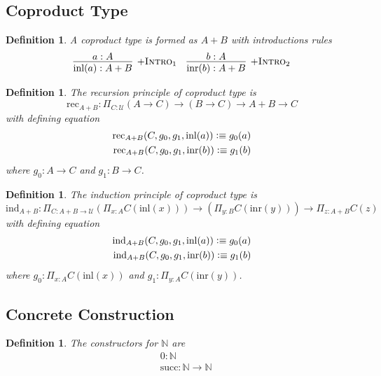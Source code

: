 \documentclass{article}
\newtheorem{definition}[theorem]{Definition}
\newcommand{\defeqv}{\vcentcolon\equiv}
\begin{document}
\subsection{Coproduct Type}

\begin{definition}
\rm A coproduct type is formed as $A + B$ with introductions rules
\[
    \infer[+\textsc{Intro}_1]{\text{inl}(a) : A + B}{a : A}  \quad \infer[+\textsc{Intro}_2]{\text{inr}(b) : A + B}{b : A}
\]
\end{definition}

\begin{definition}
\rm The recursion principle of coproduct type is
\[
    \text{rec}_{A + B} : \Pi_{C : \mathcal{U}} (A \to C) \to (B \to C) \to A + B \to C
\]
with defining equation
\[
    \begin{aligned}
    \text{rec}_{A + B}(C, g_0, g_1, \text{inl}(a)) \defeqv g_0(a) \\
    \text{rec}_{A + B}(C, g_0, g_1, \text{inr}(b)) \defeqv g_1(b) 
    \end{aligned}
\]
where $g_0 : A \to C$ and $g_1 : B \to C$.
\end{definition}

\begin{definition}
\rm The induction principle of coproduct type is
\[
    \text{ind}_{A + B} : \Pi_{C : A + B \to \mathcal{U}} (\Pi_{x : A} C(\text{inl}(x))) \to (\Pi_{y : B} C(\text{inr}(y))) \to \Pi_{z : A + B} C(z)
\]
with defining equation
\[
    \begin{aligned}
    \text{ind}_{A + B}(C, g_0, g_1, \text{inl}(a)) \defeqv g_0(a) \\
    \text{ind}_{A + B}(C, g_0, g_1, \text{inr}(b)) \defeqv g_1(b) 
    \end{aligned}
\]
where $g_0 : \Pi_{x : A} C(\text{inl}(x))$ and $g_1 : \Pi_{y : A} C(\text{inr}(y))$. 
\end{definition}


\subsection{Concrete Construction}

\begin{definition}
\rm The constructors for $\mathbb{N}$ are
\[
    \begin{aligned}
        &0 : \mathbb{N} \\
        &\text{succ} : \mathbb{N} \to \mathbb{N} 
    \end{aligned}
\]
\end{definition}
\end{document}
